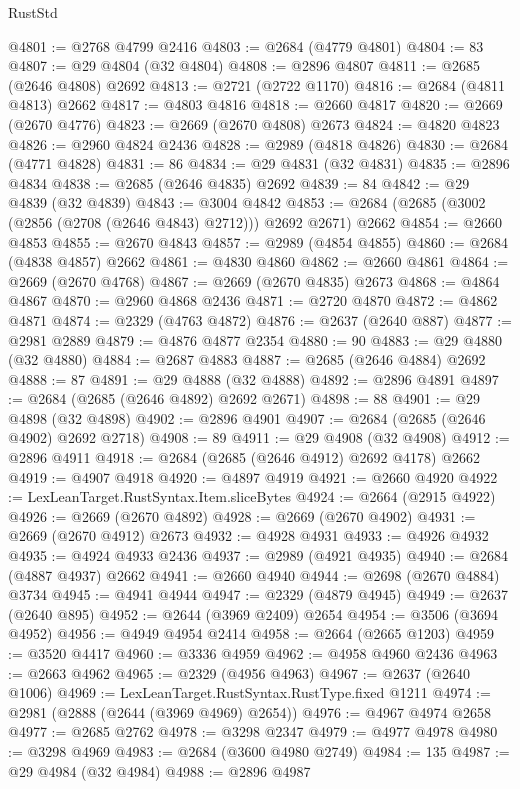 \begin{lexlean}{RustStd}
\begin{coremodule}
@4801 := @2768 @4799 @2416
@4803 := @2684 (@4779 @4801)
@4804 := 83
@4807 := @29 @4804 (@32 @4804)
@4808 := @2896 @4807
@4811 := @2685 (@2646 @4808) @2692
@4813 := @2721 (@2722 @1170)
@4816 := @2684 (@4811 @4813) @2662
@4817 := @4803 @4816
@4818 := @2660 @4817
@4820 := @2669 (@2670 @4776)
@4823 := @2669 (@2670 @4808) @2673
@4824 := @4820 @4823
@4826 := @2960 @4824 @2436
@4828 := @2989 (@4818 @4826)
@4830 := @2684 (@4771 @4828)
@4831 := 86
@4834 := @29 @4831 (@32 @4831)
@4835 := @2896 @4834
@4838 := @2685 (@2646 @4835) @2692
@4839 := 84
@4842 := @29 @4839 (@32 @4839)
@4843 := @3004 @4842
@4853 := @2684 (@2685 (@3002 (@2856 (@2708 (@2646 @4843) @2712))) @2692 @2671) @2662
@4854 := @2660 @4853
@4855 := @2670 @4843
@4857 := @2989 (@4854 @4855)
@4860 := @2684 (@4838 @4857) @2662
@4861 := @4830 @4860
@4862 := @2660 @4861
@4864 := @2669 (@2670 @4768)
@4867 := @2669 (@2670 @4835) @2673
@4868 := @4864 @4867
@4870 := @2960 @4868 @2436
@4871 := @2720 @4870
@4872 := @4862 @4871
@4874 := @2329 (@4763 @4872)
@4876 := @2637 (@2640 @887)
@4877 := @2981 @2889
@4879 := @4876 @4877 @2354
@4880 := 90
@4883 := @29 @4880 (@32 @4880)
@4884 := @2687 @4883
@4887 := @2685 (@2646 @4884) @2692
@4888 := 87
@4891 := @29 @4888 (@32 @4888)
@4892 := @2896 @4891
@4897 := @2684 (@2685 (@2646 @4892) @2692 @2671)
@4898 := 88
@4901 := @29 @4898 (@32 @4898)
@4902 := @2896 @4901
@4907 := @2684 (@2685 (@2646 @4902) @2692 @2718)
@4908 := 89
@4911 := @29 @4908 (@32 @4908)
@4912 := @2896 @4911
@4918 := @2684 (@2685 (@2646 @4912) @2692 @4178) @2662
@4919 := @4907 @4918
@4920 := @4897 @4919
@4921 := @2660 @4920
@4922 := LexLeanTarget.RustSyntax.Item.sliceBytes
@4924 := @2664 (@2915 @4922)
@4926 := @2669 (@2670 @4892)
@4928 := @2669 (@2670 @4902)
@4931 := @2669 (@2670 @4912) @2673
@4932 := @4928 @4931
@4933 := @4926 @4932
@4935 := @4924 @4933 @2436
@4937 := @2989 (@4921 @4935)
@4940 := @2684 (@4887 @4937) @2662
@4941 := @2660 @4940
@4944 := @2698 (@2670 @4884) @3734
@4945 := @4941 @4944
@4947 := @2329 (@4879 @4945)
@4949 := @2637 (@2640 @895)
@4952 := @2644 (@3969 @2409) @2654
@4954 := @3506 (@3694 @4952)
@4956 := @4949 @4954 @2414
@4958 := @2664 (@2665 @1203)
@4959 := @3520 @4417
@4960 := @3336 @4959
@4962 := @4958 @4960 @2436
@4963 := @2663 @4962
@4965 := @2329 (@4956 @4963)
@4967 := @2637 (@2640 @1006)
@4969 := LexLeanTarget.RustSyntax.RustType.fixed @1211
@4974 := @2981 (@2888 (@2644 (@3969 @4969) @2654))
@4976 := @4967 @4974 @2658
@4977 := @2685 @2762
@4978 := @3298 @2347
@4979 := @4977 @4978
@4980 := @3298 @4969
@4983 := @2684 (@3600 @4980 @2749)
@4984 := 135
@4987 := @29 @4984 (@32 @4984)
@4988 := @2896 @4987

\end{coremodule}
\end{lexlean}
